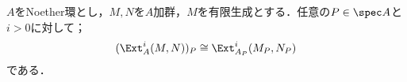 \begin{cor}
	$A$をNoether環とし，$M,N$を$A$加群，$M$を有限生成とする．任意の$P\in\spec A$と$i>0$に対して；
	\[(\Ext^i_A(M,N))_P\cong\Ext^i_{A_P}(M_P,N_P)\]
	である．
\end{cor}


%
